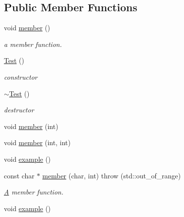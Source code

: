 \subsection*{Public Member Functions}
\begin{DoxyCompactItemize}
\item 
\hypertarget{class_test_a703997077e40c222687a0ea2973a9ea1}{void \hyperlink{class_test_a703997077e40c222687a0ea2973a9ea1}{member} ()}\label{class_test_a703997077e40c222687a0ea2973a9ea1}

\begin{DoxyCompactList}\small\item\em a member function. \end{DoxyCompactList}\item 
\hyperlink{class_test_a44e3a28c552193de099601e2910531f1}{Test} ()
\begin{DoxyCompactList}\small\item\em constructor \end{DoxyCompactList}\item 
\hyperlink{class_test_a31b169208ad4fc5344a7b6b8e1fd00c1}{$\sim$\-Test} ()
\begin{DoxyCompactList}\small\item\em destructor \end{DoxyCompactList}\item 
void \hyperlink{class_test_ac2f90eeb597ab8382dcdfcdf1df720f1}{member} (int)
\item 
void \hyperlink{class_test_aea163a1016f022bdb9e4acc3a32fa3eb}{member} (int, int)
\item 
void \hyperlink{class_test_a219565a812ad07b6517d74bdb36711ea}{example} ()
\item 
const char $\ast$ \hyperlink{class_test_a8a2453fcd30504975daa648a70a4e99e}{member} (char, int)  throw (std\-::out\-\_\-of\-\_\-range)
\begin{DoxyCompactList}\small\item\em \hyperlink{class_a}{A} member function. \end{DoxyCompactList}\item 
\hypertarget{class_test_a219565a812ad07b6517d74bdb36711ea}{void \hyperlink{class_test_a219565a812ad07b6517d74bdb36711ea}{example} ()}\label{class_test_a219565a812ad07b6517d74bdb36711ea}


\end{DoxyCompactItemize}
